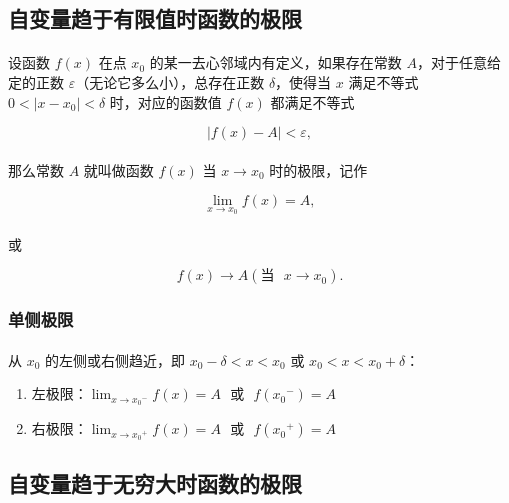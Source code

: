 \subsection{自变量趋于有限值时函数的极限}
\paragraph{}
设函数 $f(x)$ 在点 $x_0$ 的某一去心邻域内有定义，如果存在常数 $A$，对于任意给定的正数 $\varepsilon$（无论它多么小），总存在正数 $\delta$，使得当 $x$ 满足不等式 $0 < |x - x_0| < \delta$ 时，对应的函数值 $f(x)$ 都满足不等式

\begin{equation}
|f(x) - A| < \varepsilon,
\end{equation}

\paragraph{}
那么常数 $A$ 就叫做函数 $f(x)$ 当 $x \to x_0$ 时的极限，记作

\begin{equation}
\lim_{x \to x_0} f(x) = A,
\end{equation}

\paragraph{}
或

\begin{equation}
f(x) \to A(\text{当~~} x \to x_0).
\end{equation}

\subsubsection{单侧极限}
\paragraph{}
从 $x_0$ 的左侧或右侧趋近，即 $x_0 - \delta < x < x_0$ 或 $x_0 < x < x_0 + \delta$：

\begin{enumerate}
  \item 左极限：$\displaystyle{\lim_{x \to {x_0}^-}} f(x) = A \text{~~或~~} f({x_0}^-) = A$
  \item 右极限：$\displaystyle{\lim_{x \to {x_0}^+}} f(x) = A \text{~~或~~} f({x_0}^+) = A$
\end{enumerate}

\subsection{自变量趋于无穷大时函数的极限}
